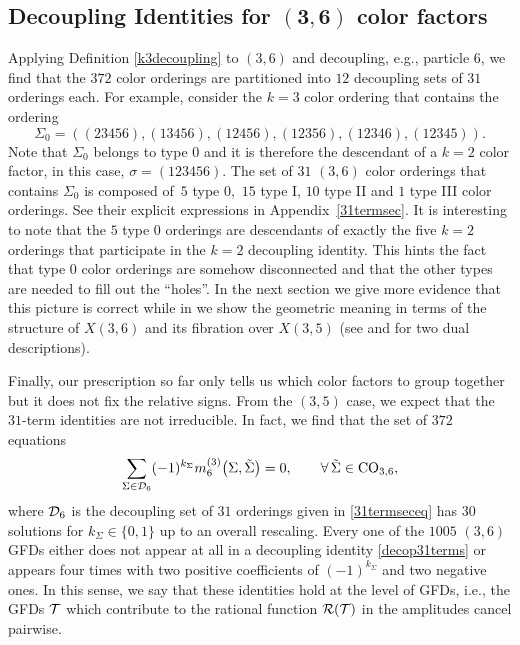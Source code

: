 \documentclass[pdftex]{sigma}
\theoremstyle{definition}
\def \be {\begin{equation}}
\def \ee {\end{equation}}
\def \be {\begin{equation}}
\numberwithin{equation}{section}
\begin{document}
\subsection[Decoupling identities for (3,6) color factors]{Decoupling Identities for $\boldsymbol{(3,6)}$ color factors}

Applying Definition \ref{k3decoupling} to $(3,6)$ and decoupling, e.g., particle $6$, we find that the $372$ color orderings are partitioned into $12$ decoupling sets of $31$ orderings each. For example, consider the $k=3$ color ordering that contains the ordering
\[
\Sigma_0 = ((23456),(13456),(12456),(12356),(12346),(12345)).
\]
Note that $\Sigma_0$ belongs to type 0 and it is therefore the descendant of a $k=2$ color factor, in this case, $\sigma= (123456)$. The set of $31$ $(3,6)$ color orderings that contains $\Sigma_0$ is composed of~$5$ type 0,~$15$ type I, $10$ type II and $1$ type III color orderings. See their explicit expressions in Appendix~\ref{31termsec}. It is interesting to note that the $5$ type 0 orderings are descendants of exactly the five $k=2$ orderings that participate in the $k=2$ decoupling identity. This hints the fact that type 0 color orderings are somehow disconnected and that the other types are needed to fill out the ``holes''. In the next section we give more evidence that this picture is correct while in \cite{Cachazo:2023ltw} we show the geometric meaning in terms of the structure of $X(3,6)$ and its fibration over $X(3,5)$ (see \cite[Figure 8.7]{yoshida2013hypergeometric} and \cite[Figure 1]{Cachazo:2019ngv} for two dual descriptions).

Finally, our prescription so far only tells us which color factors to group together but it does not fix the relative signs. From the $(3,5)$ case, we expect that the $31$-term identities are not irreducible. In fact, we find that the set of $372$ equations
%
\be
\label{decop31terms}
\sum_{\Sigma\in {\cal D}_6} (-1)^{k_\Sigma} m^{(3)}_6\big(\Sigma, \tilde\Sigma \big) = 0, \qquad \forall\, \tilde{\Sigma} \in {\rm CO}_{3,6},
\ee
%
where ${\cal D}_6$ is the decoupling set of $31$ orderings given in \eqref{31termseceq} has $30$ solutions for $k_\Sigma\in \{0,1\}$ up to an overall rescaling. Every one of the $1005$ $(3,6)$ GFDs either does not appear at all in a decoupling identity \eqref{decop31terms} or appears four times with two positive coefficients of $(-1)^{k_{\Sigma}}$ and two negative ones. In this sense, we say that
these identities hold at the level of GFDs, i.e., the GFDs ${\cal T}$ which contribute to the rational function ${\cal R}({\cal T})$ in the amplitudes cancel pairwise.
\end{document}
